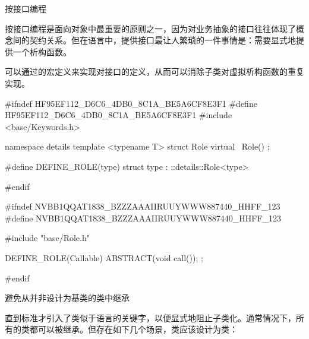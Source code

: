 \begin{content}

\begin{regulation}
按接口编程
\end{regulation}

按接口编程是面向对象中最重要的原则之一，因为对业务抽象的接口往往体现了概念间的契约关系。但在\cpp{}语言中，提供接口最让人繁琐的一件事情是：需要显式地提供一个析构函数。

可以通过的宏定义来实现对接口的定义，从而可以消除子类对虚拟析构函数的重复实现。

\begin{leftbar}
\begin{c++}[caption={base/Role.h}]
#ifndef HF95EF112_D6C6_4DB0_8C1A_BE5A6CF8E3F1
#define HF95EF112_D6C6_4DB0_8C1A_BE5A6CF8E3F1
#include <base/Keywords.h>

namespace details
{
   template <typename T>
   struct Role
   {
      virtual ~Role() {}
   };
}

#define DEFINE_ROLE(type) struct type : ::details::Role<type>

#endif
\end{c++}
\end{leftbar}

\begin{leftbar}
\begin{c++}[caption={thread/Callable.h}]
#ifndef NVBB1QQAT1838_BZZZAAAIIRUUYWWW887440_HHFF_123
#define NVBB1QQAT1838_BZZZAAAIIRUUYWWW887440_HHFF_123

#include "base/Role.h"

DEFINE_ROLE(Callable)
{
    ABSTRACT(void call());
};

#endif
\end{c++}
\end{leftbar}

\begin{regulation}
避免从并非设计为基类的类中继承
\end{regulation}

直到\cpp{}标准才引入了类似于语言的关键字，以便显式地阻止子类化。通常情况下，所有的\cpp{}类都可以被继承。但存在如下几个场景，类应该设计为类：

\begin{enum}
\end{enum}


\end{content}
